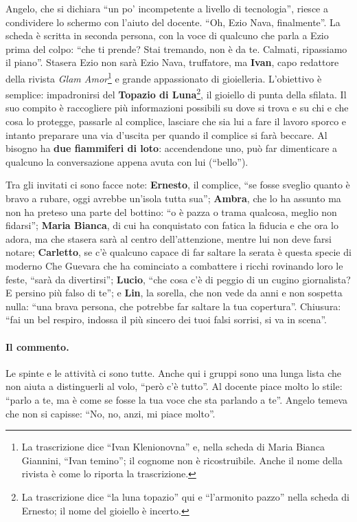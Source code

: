Angelo, che si dichiara ``un po' incompetente a livello di tecnologia'', riesce a
condividere lo schermo con l'aiuto del docente. ``Oh, Ezio Nava, finalmente''.
La scheda è scritta in seconda persona, con la voce di qualcuno che parla a Ezio
prima del colpo: ``che ti prende? Stai tremando, non è da te. Calmati, ripassiamo
il piano''. Stasera Ezio non sarà Ezio Nava, truffatore, ma \textbf{Ivan}, capo
redattore della rivista \emph{Glam Amor}\footnote{La trascrizione dice ``Ivan
Klenionovna'' e, nella scheda di Maria Bianca Giannini, ``Ivan temino''; il cognome
non è ricostruibile. Anche il nome della rivista è come lo riporta la trascrizione.}
e grande appassionato di gioielleria. L'obiettivo è semplice: impadronirsi del
\textbf{Topazio di Luna}\footnote{La trascrizione dice ``la luna topazio'' qui e
``l'armonito pazzo'' nella scheda di Ernesto; il nome del gioiello è incerto.},
il gioiello di punta della sfilata. Il suo compito è raccogliere più informazioni
possibili su dove si trova e su chi e che cosa lo protegge, passarle al complice,
lasciare che sia lui a fare il lavoro sporco e intanto preparare una via d'uscita
per quando il complice si farà beccare. Al bisogno ha \textbf{due fiammiferi di
loto}: accendendone uno, può far dimenticare a qualcuno la conversazione appena
avuta con lui (``bello'').

Tra gli invitati ci sono facce note: \textbf{Ernesto}, il complice, ``se fosse sveglio
quanto è bravo a rubare, oggi avrebbe un'isola tutta sua''; \textbf{Ambra}, che lo ha
assunto ma non ha preteso una parte del bottino: ``o è pazza o trama qualcosa,
meglio non fidarsi''; \textbf{Maria Bianca}, di cui ha conquistato con fatica la
fiducia e che ora lo adora, ma che stasera sarà al centro dell'attenzione, mentre lui
non deve farsi notare; \textbf{Carletto}, se c'è qualcuno capace di far saltare la
serata è questa specie di moderno Che Guevara che ha cominciato a combattere i ricchi
rovinando loro le feste, ``sarà da divertirsi''; \textbf{Lucio}, ``che cosa c'è di
peggio di un cugino giornalista? E persino più falso di te''; e \textbf{Lin}, la
sorella, che non vede da anni e non sospetta nulla: ``una brava persona, che
potrebbe far saltare la tua copertura''. Chiusura: ``fai un bel respiro, indossa il
più sincero dei tuoi falsi sorrisi, si va in scena''.

\paragraph{Il commento.} Le spinte e le attività ci sono tutte. Anche qui i gruppi
sono una lunga lista che non aiuta a distinguerli al volo, ``però c'è tutto''. Al
docente piace molto lo stile: ``parlo a te, ma è come se fosse la tua voce che sta
parlando a te''. Angelo temeva che non si capisse: ``No, no, anzi, mi piace molto''.

